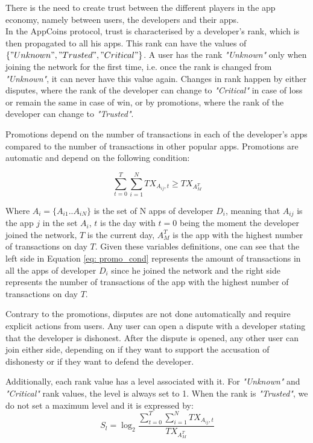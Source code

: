 There is the need to create trust between the different players in the app economy, namely between users, the developers and their apps. \\

In the AppCoins protocol, trust is characterised by a developer's rank, which is then propagated to all his apps. This rank can have the values of $\{"Unknown", "Trusted", "Critical"\}$. A user has the rank \textit{"Unknown"} only when joining the network for the first time, i.e. once the rank is changed from \textit{"Unknown"}, it can never have this value again. Changes in rank happen by either disputes, where the rank of the developer can change to \textit{"Critical"} in case of loss or remain the same in case of win, or by promotions, where the rank of the developer can change to \textit{"Trusted"}.

Promotions depend on the number of transactions in each of the developer's apps compared to the number of transactions in other popular apps. Promotions are automatic and depend on the following condition:

\begin{equation}
\sum\limits_{t=0}^{T} \sum\limits_{i=1}^{N} TX_{A_{ij},t} \geq TX_{A^{T}_{M}}
\label{eq: promo_cond}
\end{equation}

Where $A_i = \{A_{i1}..A_{iN}\}$ is the set of N apps of developer $D_i$, meaning that $A_{ij}$ is the app $j$ in the set $A_i$, $t$ is the day with $t=0$ being the moment the developer joined the network, $T$ is the current day, $A^{T}_{M}$ is the app with the highest number of transactions on day $T$. Given these variables definitions, one can see that the left side in Equation \ref{eq: promo_cond} represents the amount of transactions in all the apps of developer $D_i$ since he joined the network and the right side represents the number of transactions of the app with the highest number of transactions on day $T$.

Contrary to the promotions, disputes are not done automatically and require explicit actions from users. Any user can open a dispute with a developer stating that the developer is dishonest. After the dispute is opened, any other user can join either side, depending on if they want to support the accusation of dishonesty or if they want to defend the developer.

Additionally, each rank value has a level associated with it. For \textit{"Unknown"} and \textit{"Critical"} rank values, the level is always set to 1. When the rank is \textit{"Trusted"}, we do not set a maximum level and it is expressed by:
\begin{equation}
S_l = \log_2 \frac{\sum\limits_{t=0}^{T} \sum\limits_{i=1}^{N} TX_{A_{ij},t}}{TX_{A^{T}_{M}}}
\label{eq: rank_level}
\end{equation}

